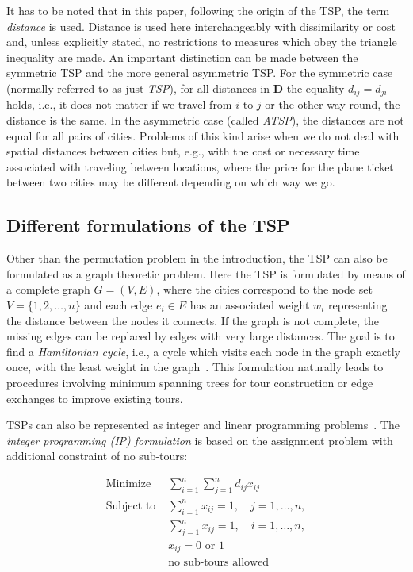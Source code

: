 \documentclass[10pt,a4paper,fleqn]{article}
\begin{document}
It has to be noted that in this paper, following the origin of the TSP,
the term \emph{distance} is used.  Distance is used here interchangeably
with dissimilarity or cost and, unless explicitly stated, no
restrictions to measures which obey the triangle inequality are made.
An important distinction can be made between the symmetric TSP and the
more general asymmetric TSP.  For the symmetric case (normally referred
to as just \emph{TSP}), for all distances in $\mathbf{D}$ the equality
$d_{ij} = d_{ji}$ holds, i.e., it does not matter if we travel from $i$
to $j$ or the other way round, the distance is the same. In the
asymmetric case (called \emph{ATSP}), the distances are not equal for
all pairs of cities.  Problems of this kind arise when we do not deal
with spatial distances between cities but, e.g., with the cost or
necessary time associated with traveling between locations, where the
price for the plane ticket between two cities may be different depending
on which way we go.

\subsection{Different formulations of the TSP}\label{sec:formulations}

Other than the permutation problem in the introduction, the TSP can also
be formulated as a graph theoretic problem. Here the TSP is formulated
by means of a complete graph $G = (V, E)$, where the cities correspond
to the node set $V = \{1,2,\ldots,n\}$ and each edge $e_i \in E$ has an
associated weight $w_i$ representing the distance between the nodes it
connects.  If the graph is not complete, the missing edges can be
replaced by edges with very large distances.  The goal is to find a
\emph{Hamiltonian cycle}, i.e., a cycle which visits each node in the
graph exactly once, with the least weight in the
graph~\citep{Hoffman1985}. This formulation naturally leads to
procedures involving minimum spanning trees for tour construction or
edge exchanges to improve existing tours.

TSPs can also be represented as integer and linear programming
problems~\citep[see, e.g.,][]{Punnen2002}.  The \emph{integer programming (IP)
formulation} is based on the assignment problem with additional
constraint of no sub-tours:


\[
\begin{array}{rl}
    \text{Minimize }     & \sum_{i=1}^n\sum_{j=1}^n{d_{ij}x_{ij}} 
                        \\[3mm]
    \text{Subject to }  & \sum_{i=1}^n{x_{ij}=1}, \quad j=1,\ldots,n, \\
                        & \sum_{j=1}^n{x_{ij}=1}, \quad i=1,\ldots,n, \\
                        & x_{ij} = 0 \text{ or } 1 \\
                        & \text{no sub-tours allowed} \\
\end{array}
\]
\end{document}
